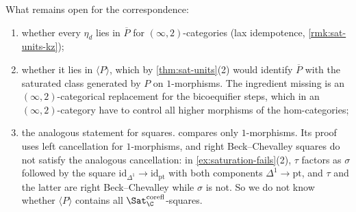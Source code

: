 \begin{rmk}
\label{rmk:sat-open}
What remains open for the correspondence:
\begin{enumerate}
\item whether every $\eta_{d}$ lies in $\overline{P}$ for $(\infty,2)$-categories (lax idempotence, \cref{rmk:sat-units-kz});
\item whether it lies in $\langle P \rangle$, which by \cref{thm:sat-units}(2) would identify $\overline{P}$ with the saturated class generated by $P$ on $1$-morphisms. The ingredient missing is an $(\infty,2)$-categorical replacement for the bicoequifier steps, which in an $(\infty,2)$-category have to control all higher morphisms of the hom-categories;
\item the analogous statement for squares.  compares only $1$-morphisms. Its proof uses left cancellation for $1$-morphisms, and right Beck--Chevalley squares do not satisfy the analogous cancellation: in \cref{ex:saturation-fails}(2), $\tau$ factors as $\sigma$ followed by the square $\mathrm{id}_{\Delta^{1}} \to \mathrm{id}_{\mathrm{pt}}$ with both components $\Delta^{1} \to \mathrm{pt}$, and $\tau$ and the latter are right Beck--Chevalley while $\sigma$ is not. So we do not know whether $\langle P \rangle$ contains all $\Sat^{\mathrm{corefl}}_{\C}$-squares.
\end{enumerate}
\end{rmk}
